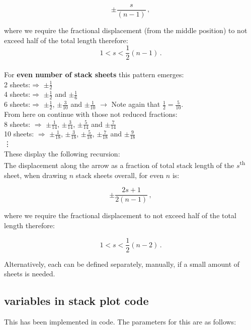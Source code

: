 \documentclass[11]{report}
\begin{document}
\[ \pm{ \frac{s}{ \left( n-1 \right) }}\,, \]

\noindent where we require the fractional displacement (from the middle position) to not exceed half of the total length therefore:\\
\[ 1 < s < \frac{1}{2} \left( n-1 \right)\,.\]\\

\noindent For {\bf even number of stack sheets} this pattern emerges:\\
\small
2 sheets:$\Rightarrow$ $\pm\frac{1}{2}$\\
4 sheets:$\Rightarrow$ $\pm\frac{1}{2}$ and $\pm\frac{1}{6}$\\
6 sheets:$\Rightarrow$ $\pm\frac{1}{2}$, $\pm\frac{3}{10}$ and $\pm\frac{1}{10}$ $\longrightarrow$ Note again that $\frac{1}{2} = \frac{5}{10}$.\\ From here on continue with those not reduced fractions:\\
8 sheets: $\Rightarrow$ $\pm\frac{1}{14}$, $\pm\frac{3}{14}$, $\pm\frac{5}{14}$ and $\pm\frac{7}{14}$\\
10 sheets:  $\Rightarrow$ $\pm\frac{1}{18}$, $\pm\frac{3}{18}$, $\pm\frac{5}{18}$, $\pm\frac{7}{18}$ and $\pm\frac{9}{18}$\\
\vdots\\
\normalsize
These display the following recursion:\\
The displacement along the arrow as a fraction of total stack length of the $s$\textsuperscript{th} sheet, when drawing $n$ stack sheets overall, for even $n$ is:

\[ \pm\frac{2s+1}{2 \left( n-1 \right) }\,, \]

\noindent where we require the fractional displacement to not exceed half of the total length therefore:

\[ 1 < s < \frac{1}{2} \left( n-2 \right)\,. \]

\noindent Alternatively, each can be defined separately, manually, if a small amount of sheets is needed.

\subsection{variables in stack plot code}

This has been implemented in code. The parameters for this are as follows:
\end{document}
